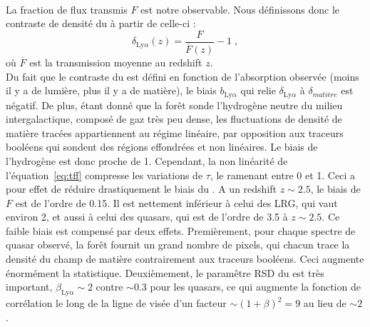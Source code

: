\paragraph{}
La fraction de flux transmis $F$ est notre observable. Nous définissons donc le contraste de densité du \lya{} à partir de celle-ci : 
\begin{equation}
  \label{eq:delta_lya}
  \delta_{\mathrm{Ly}\alpha}(z) = \frac{F}{\overline F(z)} - 1  \; , 
\end{equation}
où $\overline F$ est la transmission moyenne au redshift $z$.\\
Du fait que le contraste du \lya{} est défini en fonction de l'absorption observée (moins il y a de lumière, plus il y a de matière), le biais $b_{\mathrm{Ly}\alpha}$ qui relie $\delta_{\mathrm{Ly}\alpha}$ à $\delta_{matière}$ est négatif.
De plus, étant donné que la forêt \lya{} sonde l'hydrogène neutre du milieu intergalactique, composé de gaz très peu dense, les fluctuations de densité de matière tracées appartiennent au régime linéaire, par opposition aux traceurs booléens qui sondent des régions effondrées et non linéaires. Le biais de l'hydrogène est donc proche de 1. Cependant, la non linéarité de l'équation~\ref{eq:tff} compresse les variations de $\tau$, le ramenant entre 0 et 1. Ceci a pour effet de réduire drastiquement le biais du \lya{}. A un redshift $z \sim \num{2.5}$, le biais de $F$ est de l'ordre de \num{0.15}. Il est nettement inférieur à celui des LRG, qui vaut environ 2, et aussi à celui des quasars, qui est de l'ordre de \num{3.5} à $z \sim \num{2.5}$.
Ce faible biais est compensé par deux effets.
Premièrement, pour chaque spectre de quasar observé, la forêt \lya{} fournit un grand nombre de pixels, qui chacun trace la densité du champ de matière contrairement aux traceurs booléens. Ceci augmente énormément la statistique.
Deuxièmement, le paramêtre RSD du \lya{} est très important, $\beta_{\mathrm{Ly}\alpha} \sim 2$ contre $\sim \num{0.3}$ pour les quasars, ce qui augmente  la fonction de corrélation le long de la ligne de visée d'un facteur $\sim (1+\beta)^2 = 9$ au lieu de $\sim 2$.

